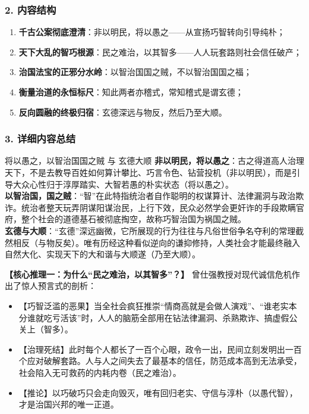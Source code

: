 \subsubsection{2. 内容结构}
\begin{enumerate}
    \item \textbf{千古公案彻底澄清}：非以明民，将以愚之——从宣扬巧智转向引导纯朴；
    \item \textbf{天下大乱的智巧根源}：民之难治，以其智多——人人玩套路则社会信任破产；
    \item \textbf{治国法宝的正邪分水岭}：以智治国国之贼，不以智治国国之福；
    \item \textbf{衡量治道的永恒标尺}：知此两者亦稽式，常知稽式是谓玄德；
    \item \textbf{反向圆融的终极归宿}：玄德深远与物反，然后乃至大顺。
\end{enumerate}

\subsubsection{3. 详细内容总结}

\begin{ConceptBox}{将以愚之，以智治国国之贼 与 玄德大顺}
\textbf{非以明民，将以愚之}：古之得道高人治理天下，不是去教导百姓如何算计攀比、巧言令色、钻营投机（非以明民），而是引导大众心性归于淳厚踏实、大智若愚的朴实状态（将以愚之）。\\
\textbf{以智治国，国之贼}：“智”在此特指统治者自作聪明的权谋算计、法律漏洞与政治欺诈。统治者整天玩弄阴谋阳谋治民，上行下效，民众必然学会更奸诈的手段欺瞒官府，整个社会的道德基石被彻底掏空，故称巧智治国为祸国之贼。\\
\textbf{玄德与大顺}：“玄德”深远幽微，它所展现的行为往往与凡俗世俗争名夺利的常理截然相反（与物反矣）。唯有历经这种看似逆向的谦抑修持，人类社会才能最终融入自然大化、实现天下的大和谐与大顺遂（乃至大顺）。
\end{ConceptBox}

\noindent\textbf{【核心推理一：为什么“民之难治，以其智多”？】}
曾仕强教授对现代诚信危机作出了惊人预言式的剖析：
\begin{itemize}
    \item 【巧智泛滥的恶果】当全社会疯狂推崇“情商高就是会做人演戏”、“谁老实本分谁就吃亏活该”时，人人的脑筋全部用在钻法律漏洞、杀熟欺诈、搞虚假公关上（智多）。
    \item 【治理死结】此时每个人都长了一百个心眼，政令一出，民间立刻发明出一百个应对破解套路。人与人之间失去了最基本的信任，防范成本高到无法承受，社会陷入无可救药的内耗内卷（民之难治）。
    \item 【推论】以巧破巧只会走向毁灭，唯有回归老实、守信与淳朴（以愚代智），才是治国兴邦的唯一正道。
\end{itemize}

